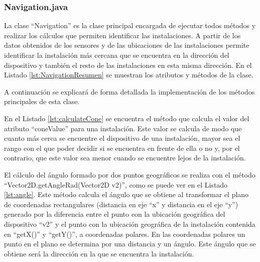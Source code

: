 \subsubsection{Navigation.java}

La clase ``Navigation'' es la clase principal encargada de  ejecutar todos métodos y realizar  los cálculos que permiten identificar las instalaciones. A partir de los datos obtenidos de los sensores y de las ubicaciones de las instalaciones permite identificar la instalación más cercana que se encuentra en la dirección del dispositivo y también el resto de las instalaciones en esta misma dirección. En el Listado \ref{lst:NavigationResumen} se muestran los atributos y métodos de la clase.


A continuación se explicará de forma detallada la implementación de los métodos principales de esta clase.

En el Listado \ref{lst:calculateCone} se encuentra el método que calcula el valor del atributo ``coneValue'' para una instalación. 
Este valor se calcula de modo que cuanto más cerca se encuentre el dispositivo de una instalación, mayor sea el rango con el que poder decidir si se encuentra en frente de ella o no y, por el contrario, que este valor sea menor cuando se encuentre lejos de la instalación.

\bigskip
\bigskip
\bigskip



El cálculo del ángulo formado por dos puntos geográficos se realiza con el método ``Vector2D.getAngleRad(Vector2D v2)'', como se puede ver en el Listado \ref{lst:angle}. Este método calcula el ángulo que se obtiene al transformar el plano de coordenadas rectangulares (distancia en eje ``x'' y distancia en el eje ``y'') generado por la diferencia entre el punto con la ubicación geográfica del dispositivo ``v2'' y el punto con la ubicación geográfica de la instalación contenida en ``getX()'' y ``getY()'', a coordenadas polares. En las coordenadas polares un punto en el plano se determina por una distancia y un ángulo. Este ángulo que se obtiene será la dirección en la que se encuentra la instalación.

